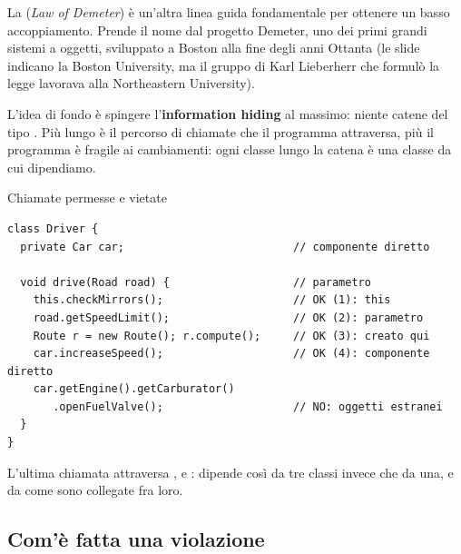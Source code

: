 La  (\textit{Law of Demeter}) è un'altra linea guida fondamentale per ottenere un basso
accoppiamento. Prende il nome dal progetto Demeter, uno dei primi grandi sistemi a oggetti, sviluppato a Boston alla fine degli
anni Ottanta (le slide indicano la Boston University, ma il gruppo di Karl Lieberherr che formulò la legge lavorava alla
Northeastern University).

L'idea di fondo è spingere l'\textbf{information hiding} al massimo: niente catene del tipo
. Più lungo è il percorso di chiamate che il programma attraversa, più il programma è fragile
ai cambiamenti: ogni classe lungo la catena è una classe da cui dipendiamo.


\begin{esempio}{Chiamate permesse e vietate}
\begin{lstlisting}[style=java]
class Driver {
  private Car car;                          // componente diretto

  void drive(Road road) {                   // parametro
    this.checkMirrors();                    // OK (1): this
    road.getSpeedLimit();                   // OK (2): parametro
    Route r = new Route(); r.compute();     // OK (3): creato qui
    car.increaseSpeed();                    // OK (4): componente diretto
    car.getEngine().getCarburator()
       .openFuelValve();                    // NO: oggetti estranei
  }
}
\end{lstlisting}
L'ultima chiamata attraversa ,  e :  dipende così da tre classi invece
che da una, e da come sono collegate fra loro.
\end{esempio}

\subsection{Com'è fatta una violazione}

